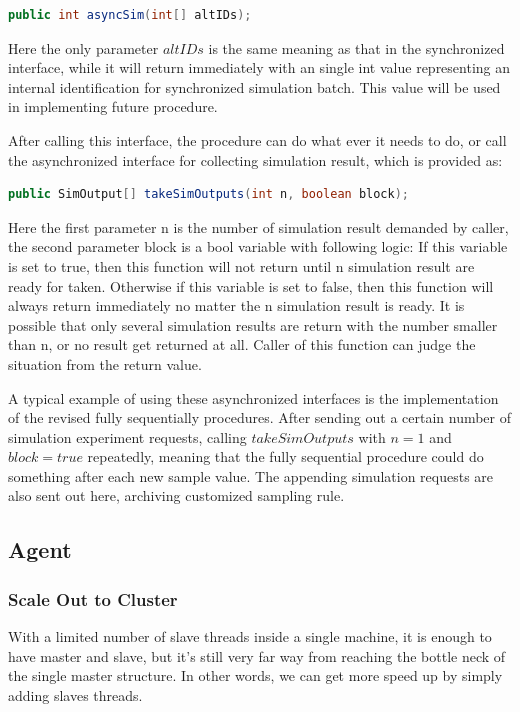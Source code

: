 \begin{lstlisting}[language=Java]
public int asyncSim(int[] altIDs);
\end{lstlisting}

Here the only parameter $altIDs$ is the same meaning as that in the synchronized interface, while it will return immediately with an single int value representing an internal identification for synchronized simulation batch. This value will be used in implementing future procedure.

After calling this interface, the procedure can do what ever it needs to do, or call the asynchronized interface for collecting simulation result, which is provided as:

\begin{lstlisting}[language=Java]
public SimOutput[] takeSimOutputs(int n, boolean block);
\end{lstlisting}

Here the first parameter n is the number of simulation result demanded by caller, the second parameter block is a bool variable with following logic: If this variable is set to true, then this function will not return until n simulation result are ready for taken. Otherwise if this variable  is set to false, then this function will always return immediately no matter the n simulation result is ready. It is possible that only several simulation results are return with the number smaller than n, or no result get returned at all. Caller of this function can judge the situation from the return value.

A typical example of using these asynchronized interfaces is the implementation of the revised fully sequentially procedures. After sending out a certain number of simulation experiment requests, calling $takeSimOutputs$ with $n = 1$ and $block = true$ repeatedly, meaning that the fully sequential procedure could do something after each new sample value. The appending simulation requests are also sent out here, archiving customized sampling rule.

\subsection{Agent}

\subsubsection{Scale Out to Cluster}

With a limited number of slave threads inside a single machine, it is enough to have master and slave, but it's still very far way from reaching the bottle neck of the single master structure. In other words, we can get more speed up by simply adding slaves threads.

